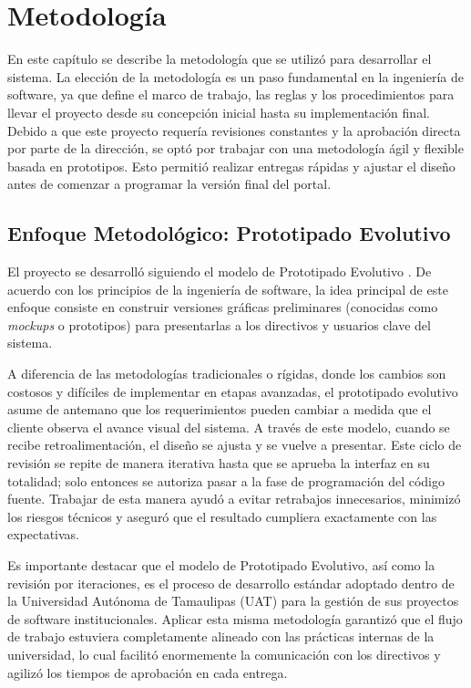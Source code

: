 \section{Metodología}

En este capítulo se describe la metodología que se utilizó para desarrollar el sistema. La elección de la metodología es un paso fundamental en la ingeniería de software, ya que define el marco de trabajo, las reglas y los procedimientos para llevar el proyecto desde su concepción inicial hasta su implementación final. Debido a que este proyecto requería revisiones constantes y la aprobación directa por parte de la dirección, se optó por trabajar con una metodología ágil y flexible basada en prototipos. Esto permitió realizar entregas rápidas y ajustar el diseño antes de comenzar a programar la versión final del portal.

\subsection{Enfoque Metodológico: Prototipado Evolutivo}
El proyecto se desarrolló siguiendo el modelo de Prototipado Evolutivo \cite{pressman2010software}. De acuerdo con los principios de la ingeniería de software, la idea principal de este enfoque consiste en construir versiones gráficas preliminares (conocidas como \textit{mockups} o prototipos) para presentarlas a los directivos y usuarios clave del sistema. 

A diferencia de las metodologías tradicionales o rígidas, donde los cambios son costosos y difíciles de implementar en etapas avanzadas, el prototipado evolutivo asume de antemano que los requerimientos pueden cambiar a medida que el cliente observa el avance visual del sistema. A través de este modelo, cuando se recibe retroalimentación, el diseño se ajusta y se vuelve a presentar. Este ciclo de revisión se repite de manera iterativa hasta que se aprueba la interfaz en su totalidad; solo entonces se autoriza pasar a la fase de programación del código fuente. Trabajar de esta manera ayudó a evitar retrabajos innecesarios, minimizó los riesgos técnicos y aseguró que el resultado cumpliera exactamente con las expectativas.

Es importante destacar que el modelo de Prototipado Evolutivo, así como la revisión por iteraciones, es el proceso de desarrollo estándar adoptado dentro de la Universidad Autónoma de Tamaulipas (UAT) para la gestión de sus proyectos de software institucionales. Aplicar esta misma metodología garantizó que el flujo de trabajo estuviera completamente alineado con las prácticas internas de la universidad, lo cual facilitó enormemente la comunicación con los directivos y agilizó los tiempos de aprobación en cada entrega.

